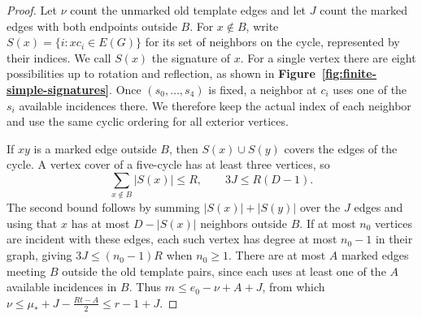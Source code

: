 \begin{proof}



Let $\nu$ count the unmarked old template edges and let $J$ count the
marked edges with both endpoints outside $B$. For $x\notin B$, write
$S(x)=\{i:xc_i\in E(G)\}$ for its set of neighbors on the cycle,
represented by their indices. We call $S(x)$ the signature of $x$.
For a single vertex there are eight possibilities up to rotation and
reflection, as shown in \textbf{Figure~\ref{fig:finite-simple-signatures}}.
Once $(s_0,\ldots,s_4)$ is fixed, a neighbor at $c_i$ uses one of the
$s_i$ available incidences there. We therefore keep the actual index of
each neighbor and use the same cyclic ordering for all exterior vertices.



If $xy$ is a marked edge outside $B$, then $S(x)\cup S(y)$ covers
the edges of the cycle. A vertex cover of a five-cycle has at least
three vertices, so
\begin{equation}\label{eq:odd-interior-slots}
 \sum_{x\notin B}|S(x)|\leq R,\qquad 3J\leq R(D-1).
\end{equation}
The second bound follows by summing $|S(x)|+|S(y)|$ over the $J$
edges and using that $x$ has at most $D-|S(x)|$ neighbors outside $B$.
If at most $n_0$ vertices are incident with these edges, each such
vertex has degree at most $n_0-1$ in their graph, giving
$3J\leq(n_0-1)R$ when $n_0\geq1$. There are at most $A$ marked
edges meeting $B$ outside the old template pairs, since each uses
at least one of the $A$ available incidences in $B$. Thus
$m\leq e_0-\nu+A+J$, from which
$\nu\leq \mu_*+J-\frac{Rt-A}{2}\leq r-1+J$.


\end{proof}
